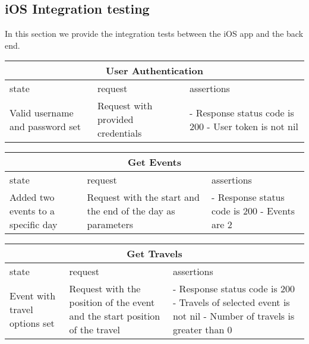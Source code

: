 \subsection{iOS Integration testing}

In this section we provide the integration tests between the iOS app and the back end.

\begin{center}
	\begin{tabular}{|p{}|p{}|p{}|}
		\hline
		\multicolumn{3}{c}{User Authentication}\\
		
		\hline
		state & request & assertions \\
		
		\hline
		Valid username and password set &
		Request with provided credentials & 
		- Response status code is 200 \newline
		- User token is not nil \newline
		\\

		\hline
	\end{tabular}
\end{center}

\begin{center}
	\begin{tabular}{|p{}|p{}|p{}|}
		\hline
		\multicolumn{3}{c}{Get Events}\\
		
		\hline
		state & request & assertions \\
		
		\hline
		Added two events to a specific day &
		Request with the start and the end of the day as parameters & 
		- Response status code is 200 \newline
		- Events are 2 \newline
		\\
		
		\hline
	\end{tabular}
\end{center}

\begin{center}
	\begin{tabular}{|p{}|p{}|p{}|}
		\hline
		\multicolumn{3}{c}{Get Travels}\\
		
		\hline
		state & request & assertions \\
		
		\hline
		Event with travel options set &
		Request with the position of the event and the start position of the travel & 
		- Response status code is 200 \newline
		- Travels of selected event is not nil \newline
		- Number of travels is greater than 0
		\\
		
		\hline
	\end{tabular}
\end{center}


